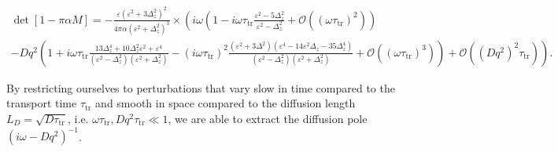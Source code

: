 \begin{multline}
  \det [1-\pi\alpha M]=
   -\frac{\varepsilon  \left(\varepsilon ^2+3\Delta_z^2\right)^2}{4 \pi  \alpha  \left(\varepsilon ^2+\Delta_z^2\right)^3}\times\left(i\omega\left(1-i\omega\tau_\text{tr}\frac{\varepsilon^2-5\Delta_z^2}{\varepsilon^2-\Delta_z^2}+\mathcal{O}((\omega\tau_\text{tr})^2)\right)\right.%
   \\
   \left.-Dq^2\left(1+i\omega\tau_\text{tr}\frac{13\Delta_z^4+10\Delta_z^2\varepsilon^2+\varepsilon^4}{(\varepsilon^2-\Delta_z^2)(\varepsilon^2+\Delta_z^2)}-(i\omega\tau_\text{tr})^2\frac{(\varepsilon^2+3\Delta^2)(\varepsilon^4-14\varepsilon^2\Delta_z-35\Delta_z^4)}{(\varepsilon^2-\Delta_z^2)(\varepsilon^2+\Delta_z^2)}+\mathcal{O}((\omega\tau_\text{tr})^3)\right)+\mathcal{O}((Dq^2)^2\tau_\text{tr})\right).
\label{chap1:eq:sdet}
\end{multline}

By restricting ourselves to perturbations that vary slow in time compared to the transport time $\tau_\text{tr}$ and smooth in space compared to the diffusion length $L_D=\sqrt{D\tau_\text{tr}}$, i.e. $\omega\tau_\text{tr},Dq^2\tau_\text{tr}\ll1$, we are able to extract the diffusion pole $(i\omega-Dq^2)^{-1}$.

